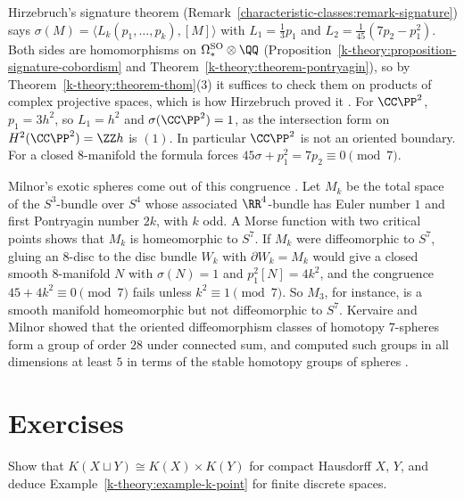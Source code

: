 \begin{example}\label{k-theory:example-signature-theorem}
Hirzebruch's signature theorem (Remark~\ref{characteristic-classes:remark-signature}) says $\sigma(M) = \langle L_k(p_1, \ldots, p_k), [M]\rangle$ with $L_1 = \frac13p_1$ and $L_2 = \frac1{45}(7p_2 - p_1^2)$. Both sides
are homomorphisms on $\Omega^{\mathrm{SO}}_* \otimes \QQ$ (Proposition~\ref{k-theory:proposition-signature-cobordism} and Theorem~\ref{k-theory:theorem-pontryagin}), so by Theorem~\ref{k-theory:theorem-thom}(3) it suffices to
check them on products of complex projective spaces, which is how Hirzebruch proved it \cite{hirzebruch-topological}. For $\CC\PP^2$, $p_1 = 3h^2$, so $L_1 = h^2$ and $\sigma(\CC\PP^2) = 1$, as the intersection form on
$H^2(\CC\PP^2) = \ZZ h$ is $(1)$. In particular $\CC\PP^2$ is not an oriented boundary. For a closed $8$-manifold the formula forces $45\sigma + p_1^2 = 7p_2 \equiv 0 \pmod 7$.
\end{example}

\begin{remark}\label{k-theory:remark-exotic-spheres}
Milnor's exotic spheres come out of this congruence \cite{milnor-1956}. Let $M_k$ be the total space of the $S^3$-bundle over $S^4$ whose associated $\RR^4$-bundle has Euler number $1$ and first Pontryagin number
$2k$, with $k$ odd. A Morse function with two critical points shows that $M_k$ is homeomorphic to $S^7$. If $M_k$ were diffeomorphic to $S^7$, gluing an $8$-disc to the disc bundle $W_k$ with $\partial W_k = M_k$
would give a closed smooth $8$-manifold $N$ with $\sigma(N) = 1$ and $p_1^2[N] = 4k^2$, and the congruence $45 + 4k^2 \equiv 0 \pmod 7$ fails unless $k^2 \equiv 1 \pmod 7$. So $M_3$, for instance, is a smooth
manifold homeomorphic but not diffeomorphic to $S^7$. Kervaire and Milnor showed that the oriented diffeomorphism classes of homotopy $7$-spheres form a group of order $28$ under connected sum, and computed such groups in
all dimensions at least $5$ in terms of the stable homotopy groups of spheres \cite{kervaire-milnor-1963}.
\end{remark}

\section{Exercises}\label{k-theory:section-exercises}

\begin{exercise}\label{k-theory:exercise-disjoint-union}
Show that $K(X \sqcup Y) \cong K(X) \times K(Y)$ for compact Hausdorff $X$, $Y$, and deduce Example~\ref{k-theory:example-k-point} for finite discrete spaces.
\end{exercise}

